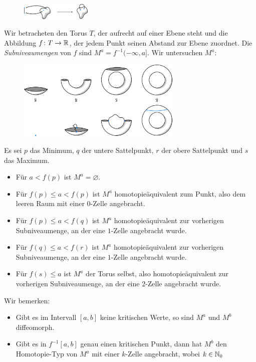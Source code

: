 \documentclass[a4paper,11pt,twoside]{scrreport}
\begin{document}
\begin{figure}[H]
    \centering
    \includegraphics[width=0.3\textwidth]{../resources/Me-Diagram1-attaching-a-1-cell.jpeg}
\end{figure}

Wir betracheten den Torus $T$, der aufrecht auf einer Ebene steht und die Abbildung 
$f \colon T \to { \mathbb R }$, der jedem Punkt seinen Abstand zur Ebene zuordnet.
Die \textit{Subniveaumengen} von $f$ sind $M^a = f^{-1} (-\infty, a]$. Wir untersuchen $M^a$:

\begin{figure}[H]
    \centering
    \includegraphics[width=0.7\textwidth]{../resources/Me-Diagram3-torus-example.jpeg}
\end{figure}

Es sei $p$ das Minimum, $q$ der untere Sattelpunkt, $r$ der obere Sattelpunkt und $s$ das Maximum.

\begin{itemize}
    \item Für $a < f(p)$ ist $M^a = \varnothing$.
    \item Für $f(p) \leq a < f(p)$ ist $M^a$ homotopieäquivalent zum Punkt,
        also dem leeren Raum mit einer $0$-Zelle angebracht.
    \item Für $f(p) \leq a < f(q)$ ist $M^a$ homotopieäquivalent zur vorherigen
        Subniveaumenge, an der eine $1$-Zelle angebracht wurde.
    \item Für $f(q) \leq a < f(r)$ ist $M^a$ homotopieäquivalent zur vorherigen
        Subniveaumenge, an der eine $1$-Zelle angebracht wurde.
    \item Für $f(s) \leq a$ ist $M^a$ der Torus selbst, also homotopieäquivalent zur 
        vorherigen Subniveaumenge, an der eine $2$-Zelle angebracht wurde.
\end{itemize}

Wir bemerken: 
\begin{itemize}
    \item Gibt es im Intervall $[a, b]$ keine kritischen Werte, so sind $M^a$ und
        $M^b$ diffeomorph.
    \item Gibt es in $f^{-1}[a, b]$ genau einen kritischen Punkt, dann hat $M^b$ 
        den Homotopie-Typ von $M^a$ mit einer $k$-Zelle angebracht, wobei 
        $k \in { \mathbb N }_0$
\end{itemize}
\end{document}
